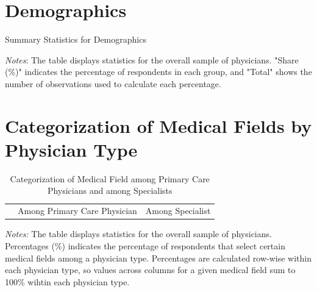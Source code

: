 \documentclass[11pt]{article}
\theoremstyle{definition}
\begin{document}
\clearpage

\section{Demographics}\label{demo}

\begin{table}[H]
    \centering
    \caption{Summary Statistics for Demographics}
              \begin{adjustbox}{width=0.55\linewidth}  

\end{adjustbox}
     \parbox{.9\linewidth}{
        	\vspace{.2cm}
        		\scriptsize{\scriptsize{{\emph{Notes}: The table displays statistics for the overall sample of physicians. "Share (\%)" indicates the percentage of respondents in each group, and "Total" shows the number of observations used to calculate each percentage.}}}}
    \label{tab:demo_table}
\end{table}

\clearpage

\section{Categorization of Medical Fields by Physician Type} 

\begin{table}[H]
    \centering
    \caption{Categorization of Medical Field among Primary Care Physicians and among Specialists}
    \begin{adjustbox}{width=0.75\linewidth} 
    \begin{tabular}{lcccccc}\toprule 
    & \multicolumn{3}{c}{Among Primary Care Physician} & \multicolumn{3}{c}{Among Specialist} \\
    \cmidrule(lr){2-4} \cmidrule(lr){5-7} 
    
    \end{tabular}
    \end{adjustbox}
    \label{tab:med_field_cat_phystype}
          {\parbox{1\linewidth}{           %
    		\scriptsize{{{ \textit{Notes:} The table displays statistics for the overall sample of physicians. Percentages (\%) indicates the percentage of respondents that select certain medical fields among a physician type. Percentages are calculated row-wise within each physician type, so values across columns for a given medical field sum to 100\% wihtin each physician type.}}}}}
\end{table}
\end{document}
